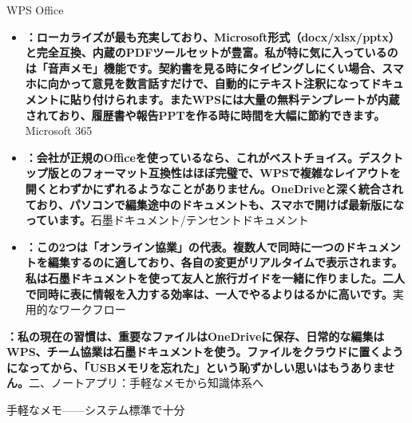 


WPS Office

\begin{itemize}
  \item \textbf{：ローカライズが最も充実しており、Microsoft形式（docx/xlsx/pptx）と完全互換、内蔵のPDFツールセットが豊富。私が特に気に入っているのは「音声メモ」機能です。契約書を見る時にタイピングしにくい場合、スマホに向かって意見を数言話すだけで、自動的にテキスト注釈になってドキュメントに貼り付けられます。またWPSには大量の無料テンプレートが内蔵されており、履歴書や報告PPTを作る時に時間を大幅に節約できます。}Microsoft 365
  \item \textbf{：会社が正規のOfficeを使っているなら、これがベストチョイス。デスクトップ版とのフォーマット互換性はほぼ完璧で、WPSで複雑なレイアウトを開くとわずかにずれるようなことがありません。OneDriveと深く統合されており、パソコンで編集途中のドキュメントも、スマホで開けば最新版になっています。}石墨ドキュメント/テンセントドキュメント
  \item \textbf{：この2つは「オンライン協業」の代表。複数人で同時に一つのドキュメントを編集するのに適しており、各自の変更がリアルタイムで表示されます。私は石墨ドキュメントを使って友人と旅行ガイドを一緒に作りました。二人で同時に表に情報を入力する効率は、一人でやるよりはるかに高いです。}実用的なワークフロー
\end{itemize}

\textbf{：私の現在の習慣は、重要なファイルはOneDriveに保存、日常的な編集はWPS、チーム協業は石墨ドキュメントを使う。ファイルをクラウドに置くようになってから、「USBメモリを忘れた」という恥ずかしい思いはもうありません。}二、ノートアプリ：手軽なメモから知識体系へ


手軽なメモ——システム標準で十分

